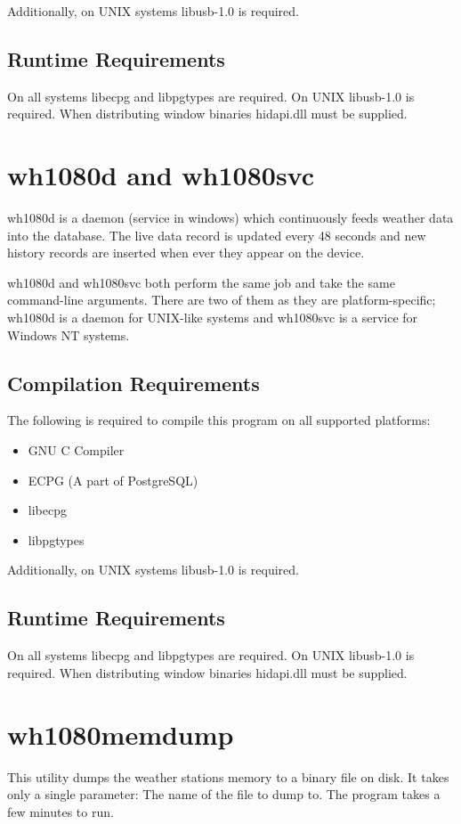 \documentclass[a4paper,10pt,draft]{book}
\begin{document}
Additionally, on UNIX systems libusb-1.0 is required.

\section{Runtime Requirements}
On all systems libecpg and libpgtypes are required. On UNIX libusb-1.0 is required. When distributing window binaries hidapi.dll must be supplied.

\chapter{wh1080d and wh1080svc}
wh1080d is a daemon (service in windows) which continuously feeds weather data into the database. The live data record is updated every 48 seconds and new history records are inserted when ever they appear on the device.

wh1080d and wh1080svc both perform the same job and take the same command-line arguments. There are two of them as they are platform-specific; wh1080d is a daemon for UNIX-like systems and wh1080svc is a service for Windows NT systems. 

\section{Compilation Requirements}
The following is required to compile this program on all supported platforms:
\begin{itemize}
\item GNU C Compiler
\item ECPG (A part of PostgreSQL)
\item libecpg
\item libpgtypes
\end{itemize}

Additionally, on UNIX systems libusb-1.0 is required.

\section{Runtime Requirements}
On all systems libecpg and libpgtypes are required. On UNIX libusb-1.0 is required. When distributing window binaries hidapi.dll must be supplied.

\chapter{wh1080memdump}
This utility dumps the weather stations memory to a binary file on disk. It takes only a single parameter: The name of the file to dump to. The program takes a few minutes to run.
\end{document}
